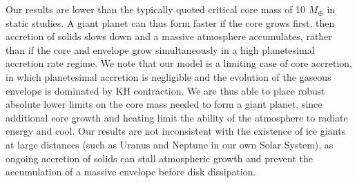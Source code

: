 \documentclass[apj, numberedappendix]{emulateapj}
\begin{document}
Our results are lower than the typically quoted critical core mass of 10 $M_{\oplus}$ in static studies. A giant planet can thus form faster if the core grows first, then accretion of solids slows down and a massive atmosphere accumulates, rather than if the core and envelope grow simultaneously in a high planetesimal accretion rate regime. We note that our model is a limiting case of core accretion, in which planetesimal accretion is negligible and the evolution of the gaseous envelope is dominated by KH contraction. We are thus able to place robust absolute lower limits on the core mass needed to form a giant planet, since additional core growth and heating limit the ability of the atmosphere to radiate energy and cool. Our results are not inconsistent with the existence of ice giants at large distances (such as Uranus and Neptune in our own Solar System), as ongoing accretion of solids can stall atmospheric growth and prevent the accumulation of a massive envelope before disk dissipation.



% 
\end{document}
